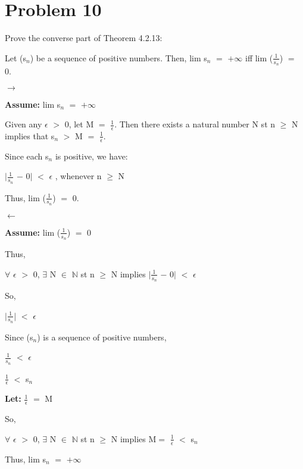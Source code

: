 \documentclass{article}
\newcommand{\mt}[1]{\ensuremath{#1}}
\newcommand\bsc[2][\DefaultOpt]{%
  \def\DefaultOpt{#2}%
  \section[#1]{#2}%
}
\newcommand{\lt}[1]{\textbf{Let: } #1}
\newcommand{\as}[1]{\textbf{Assume: } #1}
\newcommand{\bn}{\mt{\mathbb{N}} }       %
\newcommand{\ep}{\mt{\epsilon} }         %
\newcommand{\fa}{\mt{\forall} }          %
\newcommand{\mem}{\mt{\in} }
\newcommand{\exs}{\mt{\exists} }
\newcommand{\lra}{ \mt{\longrightarrow} } %
\newcommand{\lla}{ \mt{\longleftarrow} }  %
\newcommand{\av}[1]{\mt{|}#1\mt{|}}  %
\newcommand{\prn}[1]{(#1)}
\newcommand{\ms}{\mt{-} }
\newcommand{\ls}{\mt{<} }
\newcommand{\gr}{\mt{>} }
\newcommand{\gre}{\mt{\geq} }
\newcommand{\eql}{\mt{=} }
\newcommand{\uw}[2]{#1\mt{_{#2}}}
\newcommand{\frc}[2]{\mt{\frac{#1}{#2}}}
\begin{document}
\bsc{Problem 10}{
Prove the converse part of Theorem 4.2.13:

Let \prn{\uw{s}{n}} be a sequence of positive numbers. Then, lim \uw{s}{n} \eql $+\infty$ iff lim (\frc{1}{\uw{s}{n}}) \eql 0.

\lra

\as{lim \uw{s}{n} \eql $+\infty$}

Given any \ep \gr 0, let M \eql \frc{1}{\ep}. Then there exists a natural number N st n \gre N implies that \uw{s}{n} \gr M \eql \frc{1}{\ep}.

Since each \uw{s}{n} is positive, we have:

\av{\frc{1}{\uw{s}{n}} \ms 0} \ls \ep, whenever n \gre N

Thus, lim (\frc{1}{\uw{s}{n}}) \eql 0.

\lla 

\as{lim (\frc{1}{\uw{s}{n}}) \eql 0}

Thus,

\fa \ep \gr 0, \exs N \mem \bn st n \gre N implies \av{\frc{1}{\uw{s}{n}} \ms 0} \ls \ep

So,

\av{\frc{1}{\uw{s}{n}}} \ls \ep

Since \prn{\uw{s}{n}} is a sequence of positive numbers,

\frc{1}{\uw{s}{n}} \ls \ep

\frc{1}{\ep} \ls \uw{s}{n}

\lt{\frc{1}{\ep} \eql M}

So,

\fa \ep \gr 0, \exs N \mem \bn st n \gre N implies M\eql\frc{1}{\ep} \ls \uw{s}{n}

Thus, lim \uw{s}{n} \eql $+\infty$

}
\end{document}
